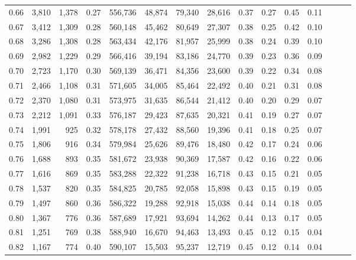 \begin{tabular}{rrrrrrrrrrrrrrr}
0.66 &   3,810 &  1,378 &  0.27 &  556,736 &   48,874 &   79,340 &   28,616 &  0.37 &  0.27 &  0.45 &      0.11 \\
0.67 &   3,412 &  1,309 &  0.28 &  560,148 &   45,462 &   80,649 &   27,307 &  0.38 &  0.25 &  0.42 &      0.10 \\
0.68 &   3,286 &  1,308 &  0.28 &  563,434 &   42,176 &   81,957 &   25,999 &  0.38 &  0.24 &  0.39 &      0.10 \\
0.69 &   2,982 &  1,229 &  0.29 &  566,416 &   39,194 &   83,186 &   24,770 &  0.39 &  0.23 &  0.36 &      0.09 \\
0.70 &   2,723 &  1,170 &  0.30 &  569,139 &   36,471 &   84,356 &   23,600 &  0.39 &  0.22 &  0.34 &      0.08 \\
0.71 &   2,466 &  1,108 &  0.31 &  571,605 &   34,005 &   85,464 &   22,492 &  0.40 &  0.21 &  0.31 &      0.08 \\
0.72 &   2,370 &  1,080 &  0.31 &  573,975 &   31,635 &   86,544 &   21,412 &  0.40 &  0.20 &  0.29 &      0.07 \\
0.73 &   2,212 &  1,091 &  0.33 &  576,187 &   29,423 &   87,635 &   20,321 &  0.41 &  0.19 &  0.27 &      0.07 \\
0.74 &   1,991 &    925 &  0.32 &  578,178 &   27,432 &   88,560 &   19,396 &  0.41 &  0.18 &  0.25 &      0.07 \\
0.75 &   1,806 &    916 &  0.34 &  579,984 &   25,626 &   89,476 &   18,480 &  0.42 &  0.17 &  0.24 &      0.06 \\
0.76 &   1,688 &    893 &  0.35 &  581,672 &   23,938 &   90,369 &   17,587 &  0.42 &  0.16 &  0.22 &      0.06 \\
0.77 &   1,616 &    869 &  0.35 &  583,288 &   22,322 &   91,238 &   16,718 &  0.43 &  0.15 &  0.21 &      0.05 \\
0.78 &   1,537 &    820 &  0.35 &  584,825 &   20,785 &   92,058 &   15,898 &  0.43 &  0.15 &  0.19 &      0.05 \\
0.79 &   1,497 &    860 &  0.36 &  586,322 &   19,288 &   92,918 &   15,038 &  0.44 &  0.14 &  0.18 &      0.05 \\
0.80 &   1,367 &    776 &  0.36 &  587,689 &   17,921 &   93,694 &   14,262 &  0.44 &  0.13 &  0.17 &      0.05 \\
0.81 &   1,251 &    769 &  0.38 &  588,940 &   16,670 &   94,463 &   13,493 &  0.45 &  0.12 &  0.15 &      0.04 \\
0.82 &   1,167 &    774 &  0.40 &  590,107 &   15,503 &   95,237 &   12,719 &  0.45 &  0.12 &  0.14 &      0.04 \\

\end{tabular}
